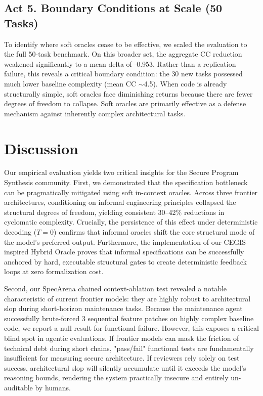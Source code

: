 \documentclass[11pt]{article}
\begin{document}
\subsection{Act 5. Boundary Conditions at Scale (50 Tasks)}

To identify where soft oracles cease to be effective, we scaled the evaluation to the full 50-task benchmark. On this broader set, the aggregate CC reduction weakened significantly to a mean delta of -0.953. Rather than a replication failure, this reveals a critical boundary condition: the 30 new tasks possessed much lower baseline complexity (mean CC $\sim$4.5). When code is already structurally simple, soft oracles face diminishing returns because there are fewer degrees of freedom to collapse. Soft oracles are primarily effective as a defense mechanism against inherently complex architectural tasks.





\section{Discussion}

Our empirical evaluation yields two critical insights for the Secure Program Synthesis community. First, we demonstrated that the specification bottleneck can be pragmatically mitigated using soft in-context oracles. Across three frontier architectures, conditioning on informal engineering principles collapsed the structural degrees of freedom, yielding consistent 30--42\% reductions in cyclomatic complexity. Crucially, the persistence of this effect under deterministic decoding ($T=0$) confirms that informal oracles shift the core structural mode of the model's preferred output. Furthermore, the implementation of our CEGIS-inspired Hybrid Oracle proves that informal specifications can be successfully anchored by hard, executable structural gates to create deterministic feedback loops at zero formalization cost.

Second, our SpecArena chained context-ablation test revealed a notable characteristic of current frontier models: they are highly robust to architectural slop during short-horizon maintenance tasks. Because the maintenance agent successfully brute-forced 3 sequential feature patches on highly complex baseline code, we report a null result for functional failure. However, this exposes a critical blind spot in agentic evaluations. If frontier models can mask the friction of technical debt during short chains, "pass/fail" functional tests are fundamentally insufficient for measuring secure architecture. If reviewers rely solely on test success, architectural slop will silently accumulate until it exceeds the model's reasoning bounds, rendering the system practically insecure and entirely un-auditable by humans. 
\end{document}
